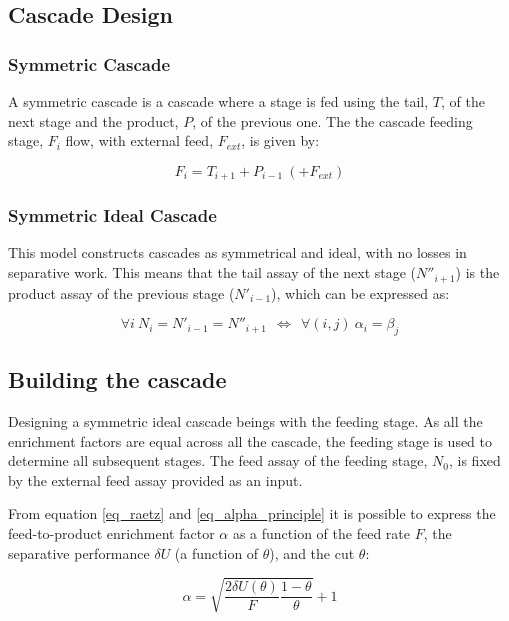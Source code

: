 \subsection{Cascade Design}
\subsubsection{Symmetric Cascade}

A symmetric cascade is a cascade where a stage is fed using the tail, $T$, of the next stage and the product, $P$, of the previous one. The the cascade feeding stage, $F_{i}$ flow, with external feed, $F_{ext}$, is given by:

\begin{equation}
    F_{i} = T_{i+1} + P_{i-1} ~(+ F_{ext})
\end{equation}

\subsubsection{Symmetric Ideal Cascade}
This model constructs cascades as symmetrical and ideal, with no losses in
separative work. This means that the tail assay of the next stage ($N''_{i+1}$)
is the product assay of the previous stage ($N'_{i-1}$), which can be
expressed as:

\begin{equation}
    \forall i~ N_{i} = N'_{i-1} = N''_{i+1}~ ~\Leftrightarrow~ ~\forall (i,j)~
    \alpha_{i} = \beta_{j}
\end{equation}



\subsection{Building the cascade}

Designing a symmetric ideal cascade beings with the feeding
stage. As all the enrichment factors are equal across all the cascade, the
feeding stage is used to determine all subsequent stages.
The feed assay of the feeding stage, $N_{0}$, is fixed by the external feed assay
provided as an input.

From equation \eqref{eq_raetz} and \eqref{eq_alpha_principle} it is possible to
express the feed-to-product enrichment factor $\alpha$ as a function of the feed rate $F$, the separative performance
$\delta U$ (a function of $\theta$), and the cut $\theta$:

\begin{equation} \label{eq_alpha}
    \alpha = \sqrt{\frac{2\delta U(\theta)}{F} \frac{1-\theta}{\theta}} + 1
\end{equation}


